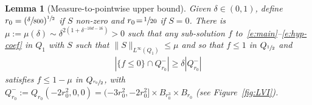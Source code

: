 \documentclass[10pt]{amsart}
\newtheorem{lemma}[theorem]{Lemma}
\theoremstyle{definition}
\theoremstyle{remark}
\begin{document}
\begin{lemma}[Measure-to-pointwise upper bound]
\label{l:increase}
Given $\delta \in (0,1)$, define
$r_0 = (\sfrac{\delta}{800})^{\sfrac12}$ if $S$ non-zero and
$r_0\!=\!\sfrac{1}{20}$ if $S\!=\!0$. There is
\hbox{$\mu\!:=\!\mu(\delta)\sim \delta^{2 (1+\delta^{-10d-16})}\!>\!0$} such
that any sub-solution $f$ to~\eqref{e:main}--\eqref{e:hyp-coef}
in $Q_1$ with $S$ such that
$\| S\|_{L^{\infty}(Q_1)}\le \mu$ and so that $f\leq 1$ in
$Q_{\sfrac{1}{2}}$ and
\begin{align}
\label{eq:measure-hyp-pointwise}
\left| \{ f \leq 0 \} \cap Q_{r_0}^- \right| \ge \delta
\left| Q_{r_0}^- \right|
\end{align}
satisfies $f \le 1-\mu$ in $Q_{\sfrac{r_0}{2}}$, with
$Q_{r_0}^{-} := Q_{r_0}(-2r_0^2,0,0) =(-3r_0^2,-2r_0^2] \times
B_{r_0^3} \times B_{r_0}$ (see Figure~\ref{fig:LVI}).
\end{lemma}
\end{document}
